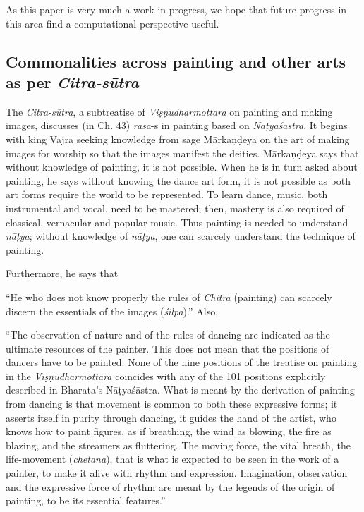 As this paper is very much a work in progress, we hope that future progress in this area find a computational perspective useful.

\subsection{Commonalities across painting and other arts as per \textsl{Citra-sūtra}}\label{chap7-sec1.3}

The \textsl{Citra-sūtra}, a subtreatise of \textsl{Viṣṇudharmottara} on painting and making images, discusses (in Ch. 43) \textsl{rasa}-s in painting based on \textsl{Nāṭyaśāstra}. It begins with king Vajra seeking knowledge from sage Mārkaṇḍeya on the art of making images for worship so that the images manifest the deities. Mārkaṇḍeya says that without knowledge of painting, it is not possible. When he is in turn asked about painting, he says without knowing the dance art form, it is not possible as both art forms require the world to be represented. To learn dance, music, both instrumental and vocal, need to be mastered; then, mastery is also required of classical, vernacular and popular music. Thus painting is needed to understand \textsl{nāṭya}; without knowledge of \textsl{nāṭya}, one can scarcely understand the technique of painting. 

Furthermore, he says that

\begin{myquote}
“He who does not know properly the rules of \textsl{Chitra} (painting) can scarcely discern the essentials of the images (\textsl{śilpa}).” Also, 

“The observation of nature and of the rules of dancing are indicated as the ultimate resources of the painter. This does not mean that the positions of dancers have to be painted. None of the nine positions of the treatise on painting in the \textsl{Viṣṇudharmottara} coincides with any of the 101 positions explicitly described in Bharata's Nāṭyaśāstra. What is meant by the derivation of painting from dancing is that movement is common to both these expressive forms; it asserts itself in purity through dancing, it guides the hand of the artist, who knows how to paint figures, as if breathing, the wind as blowing, the fire as blazing, and the streamers as fluttering. The moving force, the vital breath, the life-movement (\textsl{chetana}), that is what is expected to be seen in the work of a painter, to make it alive with rhythm and expression. Imagination, observation and the expressive force of rhythm are meant by the legends of the origin of painting, to be its essential features.” 
\end{myquote}

